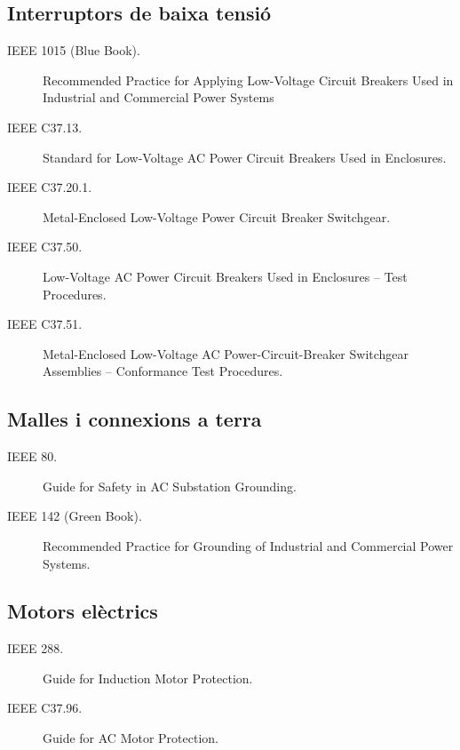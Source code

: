 \subsection*{Interruptors de baixa tensió}
\begin{description}
\item [\hspace{5mm}IEEE 1015 (Blue Book).] Recommended Practice for Applying Low-Voltage Circuit Breakers Used in Industrial and Commercial Power Systems 
     \item [\hspace{5mm}IEEE C37.13.] Standard for Low-Voltage AC Power Circuit Breakers Used in Enclosures. 
    \item [\hspace{5mm}IEEE C37.20.1.] Metal-Enclosed Low-Voltage Power Circuit Breaker Switchgear.
    \item [\hspace{5mm}IEEE C37.50.] Low-Voltage AC Power Circuit Breakers Used in Enclosures -- Test Procedures.
    \item [\hspace{5mm}IEEE C37.51.] Metal-Enclosed Low-Voltage AC Power-Circuit-Breaker Switchgear Assemblies -- Conformance Test Procedures.
\end{description}


\subsection*{Malles i connexions a terra}
\begin{description}
    \item [\hspace{5mm}IEEE 80.] Guide for Safety in AC Substation Grounding.
    \item [\hspace{5mm}IEEE 142 (Green Book).] Recommended Practice for Grounding of Industrial and Commercial Power Systems.
\end{description}

\subsection*{Motors elèctrics}
\begin{description}
    \item [\hspace{5mm}IEEE 288.] Guide for Induction Motor Protection.
    \item [\hspace{5mm}IEEE C37.96.] Guide for AC Motor Protection.
\end{description}


